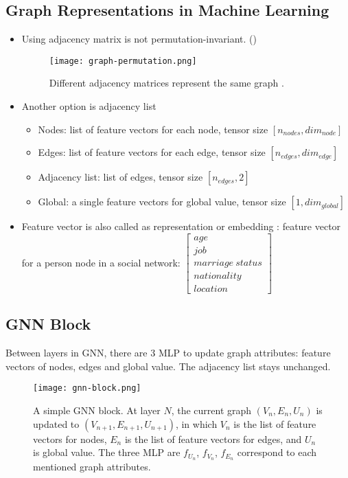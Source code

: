 \subsection{Graph Representations in Machine Learning}
\begin{itemize}
	\item Using adjacency matrix is not permutation-invariant. ()
	\begin{figure}[hbt!]
		\centering
		\texttt{[image: graph-permutation.png]}
		\caption{Different adjacency matrices represent the same graph \cite{sanchez2021a}.}
		\label{fig:graph-permutation}
	\end{figure}
	\item Another option is adjacency list
	\begin{itemize}
		\item Nodes: list of feature vectors for each node, tensor size $[n_{nodes}, dim_{node}]$
		\item Edges: list of feature vectors for each edge, tensor size $[n_{edges}, dim_{edge}]$
		\item Adjacency list: list of edges, tensor size $[n_{edges}, 2]$
		\item Global: a single feature vectors for global value, tensor size $[1, dim_{global}]$
	\end{itemize}
	\item Feature vector is also called as representation or embedding
	\Eg: feature vector for a person node in a social network: $\begin{bmatrix}
		age\\
		job\\
		marriage\ status\\
		nationality\\
		location
	\end{bmatrix}$
\end{itemize}

\subsection{GNN Block}
Between layers in \ac{GNN}, there are 3 \ac{MLP} to update graph attributes: feature vectors of nodes, edges and global value. \note The adjacency list stays unchanged.
\begin{figure}[hbt!]
	\centering
	\texttt{[image: gnn-block.png]}
	\caption{A simple \ac{GNN} block. At layer $N$, the current graph $(V_n, E_n, U_n)$ is updated to $(V_{n+1}, E_{n+1}, U_{n+1})$, in which $V_n$ is the list of feature vectors for nodes, $E_n$ is the list of feature vectors for edges, and $U_n$ is global value. The three \ac{MLP} are $f_{U_n}$, $f_{V_n}$, $f_{E_n}$ correspond to each mentioned graph attributes.}
	\label{fig:gnn-block}
\end{figure}

